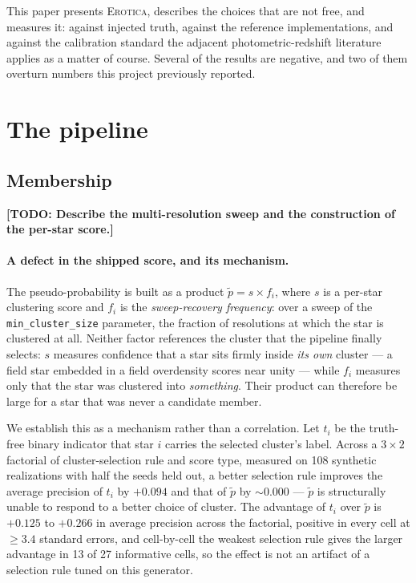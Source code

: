 \documentclass{aa}
\newcommand{\TODO}[1]{\textbf{[TODO: #1]}}
\newcommand{\erotica}{\textsc{Erotica}}
\begin{document}
This paper presents \erotica, describes the choices that are not free, and measures it: against
injected truth, against the reference implementations, and against the calibration standard the
adjacent photometric-redshift literature applies as a matter of course. Several of the results are
negative, and two of them overturn numbers this project previously reported.

\section{The pipeline}
\label{sec:pipeline}

\subsection{Membership}
\label{sec:membership}

\TODO{Describe the multi-resolution sweep and the construction of the per-star score.}

\paragraph{A defect in the shipped score, and its mechanism.}
The pseudo-probability is built as a product $\tilde{p} = s \times f_i$, where $s$ is a
per-star clustering score and $f_i$ is the \emph{sweep-recovery frequency}: over a sweep of the
\texttt{min\_cluster\_size} parameter, the fraction of resolutions at which the star is
clustered at all. Neither factor references the cluster that the pipeline finally selects: $s$
measures confidence that a star sits firmly inside \emph{its own} cluster --- a field star
embedded in a field overdensity scores near unity --- while $f_i$ measures only that the star
was clustered into \emph{something}. Their product can therefore be large for a star that was
never a candidate member.

We establish this as a mechanism rather than a correlation. Let $t_i$ be the truth-free binary
indicator that star $i$ carries the selected cluster's label. Across a $3\times2$ factorial of
cluster-selection rule and score type, measured on 108 synthetic realizations with half the seeds
held out, a better selection rule improves the average precision of $t_i$ by $+0.094$ and that of
$\tilde{p}$ by $\sim\!0.000$
--- $\tilde{p}$ is structurally unable to respond to a better choice of cluster. The advantage of
$t_i$ over $\tilde{p}$ is $+0.125$ to $+0.266$ in average precision across the factorial, positive
in every cell at $\geq3.4$ standard errors, and cell-by-cell the weakest selection rule gives the
larger advantage in 13 of 27 informative cells, so the effect is not an artifact of a selection
rule tuned on this generator.
\end{document}
